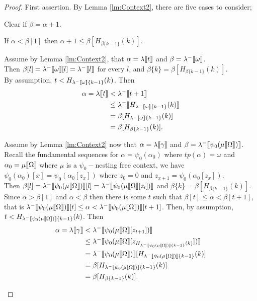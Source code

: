 \documentclass{amsart}
\theoremstyle{plain}
\theoremstyle{plain}
\def\scbrl{[\hspace{-.14em}[}
\def\scbrr{]\hspace{-.14em}]}
\def\scbr#1{\scbrl#1\scbrr}
\newcommand{\Om}{{\Omega}}
\newcommand{\al}{{\alpha}}
\newcommand{\be}{{\beta}}
\newcommand{\ga}{\gamma}
\newcommand{\la}{\lambda}
\newcommand{\om}{\omega}
\def\scbrl{[\hspace{-.14em}[}
\def\scbrr{]\hspace{-.14em}]}
\def\scbr#1{\scbrl#1\scbrr}
\begin{document}
\begin{proof}
First assertion. By Lemma \ref{lm:Context2}, there are five cases to consider;
\begin{Cases}
    \item Clear if $\be= \al+1$.
    
    \item If $\al<\be[1]$ then $\al+1 \leq \be[H_{\be\{k-1\}}(k)]$.
    
    \item 	Assume by Lemma \ref{lm:Context2}, that $\al=\la\scbr{t}$ and  $\be=\la^-\scbr{\om}$.\\
    Then  $\be[l] = \la^-\scbr{\om}[l] =  \la^-\scbr{l} $ for every $l$, and $\be\{k\}= \be[H_{\be\{k-1\}}(k)]$.\\
    By assumption,  $t< H_{\la^-\scbr{\om}\{k-1\}}(k)$. Then
    \begin{align*}
        \al = \la\scbr{t} &< \la^-\scbr{t+1} \\
        &\leq \la^-\scbr{H_{\la^-\scbr{\om}\{k-1\}}(k)} \\
        &= \be[H_{\la^-\scbr{\om}\{k-1\}}(k)]\\
        &= \be[H_{\be\{k-1\}}(k)].
    \end{align*}
    
    \item 
    Assume by Lemma \ref{lm:Context2} now that  $\al=\la\scbr{\ga}$ and $\be=\la^-\scbr{\psi_0(\mu\scbr{\Om})}$.\medskip\\
    Recall the fundamental sequences for $\al = \psi_0(\al_0)$ where $tp(\al)=\om$ and $\al_0=\mu\scbr{\Om}$ where $\mu$ is a $\psi_0-$nesting free context, we have 
    $\psi_0(\al_0)[x] = \psi_0(\al_0[z_x])$ where $z_0=0$ and $z_{x+1}= \psi_0(\al_0[z_x])$.\medskip\\
    Then $\be[l] = \la^-\scbr{\psi_0(\mu\scbr{\Om})}[l] = \la^-\scbr{\psi_0(\mu\scbr{\Om}[z_l])}$ and $\be\{k\}= \be[H_{\be\{k-1\}}(k)]$.\\
    Since $\al> \be[1]$ and $\al<\be$ then there is some $t$ such that $\be[t]\leq \al<\be[t+1]$, that is $\la^-\scbr{\psi_0(\mu\scbr{\Om})}[t]\leq \al < \la^-\scbr{\psi_0(\mu\scbr{\Om})}[t+1]$. Then, by assumption, $t<H_{\la^-\scbr{\psi_0(\mu\scbr{\Om})}\{k-1\}}(k)$.
    Then
    \begin{align*}
        \al = \la\scbr{\ga}
        &< \la^-\scbr{\psi_0(\mu\scbr{\Om}[z_{t+1}])}\\
        &\leq \la^-\scbr{\psi_0(\mu\scbr{\Om}[z_{H_{\la^-\scbr{\psi_0(\mu\scbr{\Om})}\{k-1\}}(k)}])}\\
        &= \la^-\scbr{\psi_0(\mu\scbr{\Om})}[H_{\la^-\scbr{\psi_0(\mu\scbr{\Om})}\{k-1\}}(k)]\\
        &=\be[H_{\la^-\scbr{\psi_0(\mu\scbr{\Om})}\{k-1\}}(k)]\\
        &= \be[H_{\be\{k-1\}}(k)].
    \end{align*}
    

\end{Cases}
\end{proof}
\end{document}
